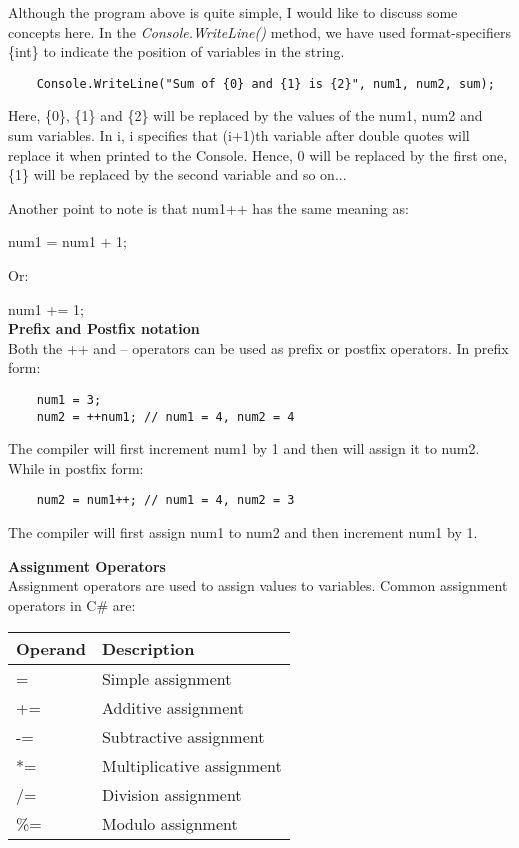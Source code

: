 Although the program above is quite simple, I would like to discuss some concepts here. In the
\emph{Console.WriteLine()} method, we have used format-specifiers \{int\} to indicate the position of variables in the
string.\\

\begin{lstlisting}
    Console.WriteLine("Sum of {0} and {1} is {2}", num1, num2, sum);
\end{lstlisting}


Here, \{0\}, \{1\} and \{2\} will be replaced by the values of the num1, num2 and sum variables. In {i}, i specifies that
(i+1)th variable after double quotes will replace it when printed to the Console. Hence, {0} will be replaced by the
first one, \{1\} will be replaced by the second variable and so on...

Another point to note is that num1++ has the same meaning as:

num1 = num1 + 1;

Or:

num1 += 1;\\

\textbf{Prefix and Postfix notation}\\

Both the ++ and -- operators can be used as prefix or postfix operators. In prefix form:\\

\begin{lstlisting}
    num1 = 3;
    num2 = ++num1; // num1 = 4, num2 = 4        
\end{lstlisting}

The compiler will first increment num1 by 1 and then will assign it to num2. While in postfix form:

\begin{lstlisting}
    num2 = num1++; // num1 = 4, num2 = 3    
\end{lstlisting}


The compiler will first assign num1 to num2 and then increment num1 by 1.

\textbf{Assignment Operators}\\
Assignment operators are used to assign values to variables. Common assignment operators in C\# are:

\begin{center}
    \begin{tabular}{ | m{5em} | m{10cm} | } 
    \hline
    Operand & Description \\
    \hline
    = & Simple assignment\\
    += & Additive assignment\\
    -= & Subtractive assignment\\
    *= & Multiplicative assignment\\
    /= & Division assignment\\
    \%= & Modulo assignment\\
    \hline
    \end{tabular}
\end{center}


